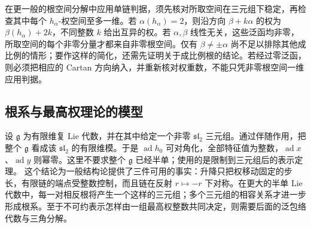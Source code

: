 在更一般的根空间分解中应用单链判据，须先核对所取空间在三元组下稳定，再检查其中每个 \(h_\alpha\)-权空间至多一维。若 \(\alpha(h_\alpha)=2\)，则沿方向 \(\beta+k\alpha\) 的权为 \(\beta(h_\alpha)+2k\)，不同整数 \(k\) 给出互异的权。若 \(\alpha,\beta\) 线性无关，这些泛函均非零，所取空间的每个非零分量才都来自非零根空间。仅有 \(\beta\ne\pm\alpha\) 尚不足以排除其他成比例的情形；要作这样的简化，还需先证明关于成比例根的结论。若经过零泛函，则必须把相应的 Cartan 方向纳入，并重新核对权重数，不能只凭非零根空间一维应用判据。

\subsection{根系与最高权理论的模型}
\label{b5:subsec:1404:03}

设 \(\mathfrak g\) 为有限维复 Lie 代数，并在其中给定一个非零 \(\mathfrak{sl}_2\) 三元组。通过伴随作用，把整个 \(\mathfrak g\) 看成该 \(\mathfrak{sl}_2\) 的有限维模。于是 \(\operatorname{ad}h_0\) 可对角化，全部特征值为整数，\(\operatorname{ad}x\)、\(\operatorname{ad}y\) 则幂零。这里不要求整个 \(\mathfrak g\) 已经半单；使用的是限制到三元组后的表示定理。
\ProseParagraphBreak
这个结论为一般结构论提供了三件可用的事实：升降只把权移动固定的步长，有限链的端点受整数控制，而且链在反射 \(r\mapsto-r\) 下对称。在更大的半单 Lie 代数中，每一对相反根将产生一个这样的三元组；多个三元组的相容关系才进一步形成根系。至于不可约表示怎样由一组最高权整数共同决定，则需要后面的泛包络代数与三角分解。
